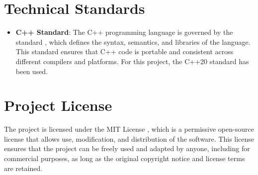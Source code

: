 \section{Technical Standards}
\begin{itemize}
    \item \textbf{C++ Standard}: The C++ programming language is governed by the standard \cite{cpp-standard}, which defines the syntax, semantics, and libraries of the language. This standard ensures that C++ code is portable and consistent across different compilers and platforms. For this project, the C++20 standard \cite{cpp20-standard} has been used.
\end{itemize}

\section{Project License}
The project is licensed under the MIT License \cite{mit-license}, which is a permissive open-source license that allows use, modification, and distribution of the software. This license ensures that the project can be freely used and adapted by anyone, including for commercial purposes, as long as the original copyright notice and license terms are retained.

